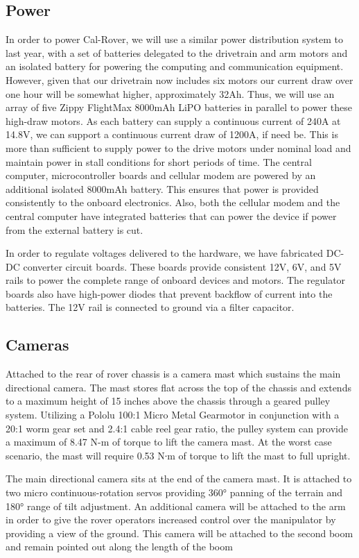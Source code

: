\documentclass[titlepage,twocolumn,10pt]{article}
\begin{document}
    \subsection{Power}
    In order to power Cal-Rover, we will use a similar power distribution system to last year, with a set of batteries delegated to the drivetrain and arm motors and an isolated battery for powering the computing and communication equipment.  However, given that our drivetrain now includes six motors our current draw over one hour will be somewhat higher, approximately 32Ah.  Thus, we will use an array of five Zippy FlightMax 8000mAh LiPO batteries in parallel to power these high-draw motors.  As each battery can supply a continuous current of 240A at 14.8V, we can support a continuous current draw of 1200A, if need be.   This is more than sufficient to supply power to the drive motors under nominal load and maintain power in stall conditions for short periods of time.  The central computer, microcontroller boards and cellular modem are powered by an additional isolated 8000mAh battery.  This ensures that power is provided consistently to the onboard electronics.  Also, both the cellular modem and the central computer have integrated batteries that can power the device if power from the external battery is cut.

    In order to regulate voltages delivered to the hardware, we have fabricated DC-DC converter circuit boards.  These boards provide consistent 12V, 6V, and 5V rails to power the complete range of onboard devices and motors.  The regulator boards also have high-power diodes that prevent backflow of current into the batteries.  The 12V rail is connected to ground via a filter capacitor.

    \subsection{Cameras}
    Attached to the rear of rover chassis is a camera mast which sustains the main directional camera. The mast stores flat across the top of the chassis and extends to a maximum height of 15 inches above the chassis through a geared pulley system. Utilizing a Pololu 100:1 Micro Metal Gearmotor in conjunction with a 20:1 worm gear set and 2.4:1 cable reel gear ratio, the pulley system can provide a maximum of 8.47 N-m of torque to lift the camera mast. At the worst case scenario, the mast will require 0.53 N∙m of torque to lift the mast to full upright.

    The main directional camera sits at the end of the camera mast. It is attached to two micro continuous-rotation servos providing 360° panning of the terrain and 180° range of tilt adjustment.
    An additional camera will be attached to the arm in order to give the rover operators increased control over the manipulator by providing a view of the ground. This camera will be attached to the second boom and remain pointed out along the length of the boom
\end{document}
